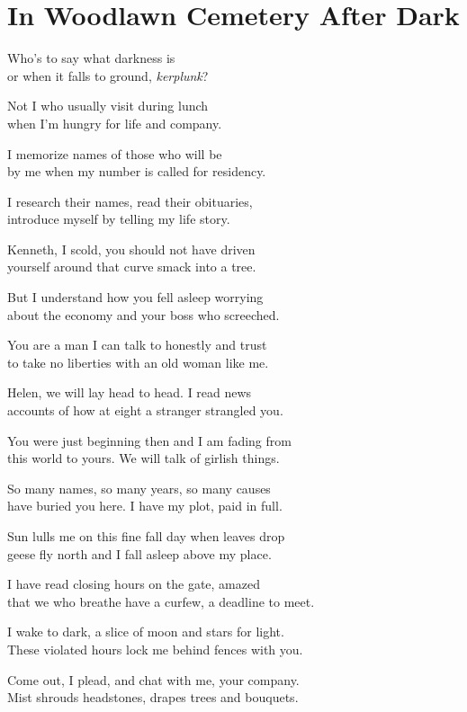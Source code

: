 \documentclass[twoside,10pt]{book}
\begin{document}
\clearpage
\section{In Woodlawn Cemetery After Dark}

Who's to say what darkness is\\
or when it falls to ground, \emph{kerplunk}?

Not I who usually visit during lunch\\
when I'm hungry for life and company.

I memorize names of those who will be\\
by me when my number is called for residency.

I research their names, read their obituaries,\\
introduce myself by telling my life story.

Kenneth, I scold, you should not have driven\\
yourself around that curve smack into a tree.

But I understand how you fell asleep worrying\\
about the economy and your boss who screeched.

You are a man I can talk to honestly and trust\\
to take no liberties with an old woman like me.

Helen, we will lay head to head. I read news\\
accounts of how at eight a stranger strangled you.

You were just beginning then and I am fading from\\
this world to yours. We will talk of girlish things.

So many names, so many years, so many causes\\
have buried you here. I have my plot, paid in full.

Sun lulls me on this fine fall day when leaves drop\\
geese fly north and I fall asleep above my place.

I have read closing hours on the gate, amazed\\
that we who breathe have a curfew, a deadline to meet.

I wake to dark, a slice of moon and stars for light.\\
These violated hours lock me behind fences with you.

Come out, I plead, and chat with me, your company.\\
Mist shrouds headstones, drapes trees and bouquets.
\end{document}
